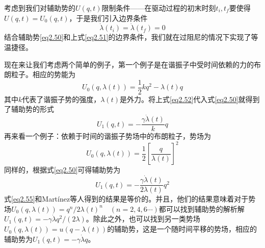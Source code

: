 考虑到我们对辅助势的$U(q,t)$限制条件——在驱动过程的初末时刻$t_i , t_f$要使得$U(q,t)=U_0 (q,t)$，于是我们引入边界条件
\begin{equation}
    \dot{\lambda}(t_i)=\dot{\lambda}(t_f)=0
    \label{eq2.51}
\end{equation}
结合辅助势\eqref{eq2.50}和上式\eqref{eq2.51}的边界条件，我们就在过阻尼的情况下实现了等温捷径。

现在来让我们考虑两个简单的例子，第一个例子是在谐振子中受时间依赖的力的布朗粒子。相应的势能为
\begin{equation}
    U_{0}(q, \lambda(t))=\frac{1}{2} k q^{2}-\lambda(t) q
    \label{eq2.52}
\end{equation}
其中$k$代表了谐振子势的强度，$\lambda(t)$是外力。将上式\eqref{eq2.52}代入式\eqref{eq2.50}就得到了辅助势的形式
\begin{equation}
    U_{1}(q, t)=-\frac{\gamma \dot{\lambda}(t)}{k} q
    \label{eq2.53}
\end{equation}
再来看一个例子：依赖于时间的谐振子势场中的布朗粒子，势场为
\begin{equation}
    U_{0}(q, \lambda(t))=\frac{1}{2} {\left[ \frac{q}{ \lambda(t)} \right]}^{2}
    \label{eq2.54}
\end{equation}
同样的，根据式\eqref{eq2.50}可得辅助势为
\begin{equation}
    U_{1}(q, t)=-\frac{\gamma \dot{\lambda}(t)}{2 \lambda(t)} q^{2}
    \label{eq2.55}
\end{equation}
式\eqref{eq2.55}和Martínez等人得到的结果\cite{Martinez2016}是等价的。并且，他们的结果意味着对于势场$U_0 (q, \lambda(t))= q^{n} / 2 \lambda(t)^n   \quad (n=2,4,6\cdots)$都可以找到辅助势的解析解$U_{1}(q, t)=- \gamma \dot{\lambda} q^{2} /(2  \lambda)$。除此之外，也可以找到另一类势场$U_{0}(q, \lambda(t))=u(q-\lambda(t))$的辅助势\cite{Li2016}，这是一个随时间平移的势场，相应的辅助势为$U_{1}(q, t)=-\gamma \dot{\lambda} q$。


